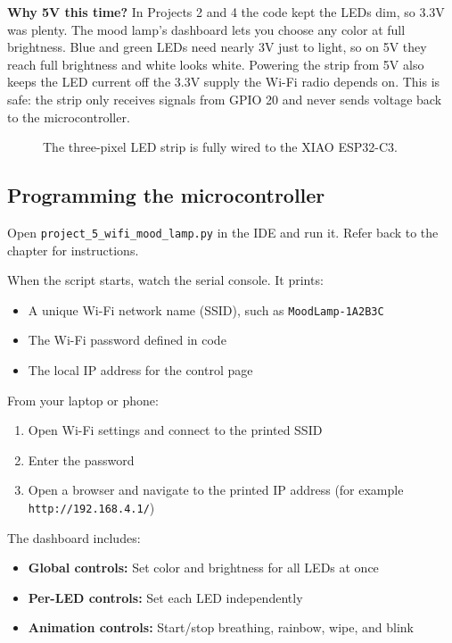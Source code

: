\begin{tcolorbox}[colback=blue!5!white,colframe=blue!40!black]
    \textbf{Why 5V this time?} In Projects 2 and 4 the code kept the LEDs dim, so 3.3V was plenty.
    The mood lamp's dashboard lets you choose any color at full brightness. Blue and green LEDs need
    nearly 3V just to light, so on 5V they reach full brightness and white looks white. Powering the
    strip from 5V also keeps the LED current off the 3.3V supply the Wi-Fi radio depends on. This is
    safe: the strip only receives signals from GPIO 20 and never sends voltage back to the
    microcontroller.
\end{tcolorbox}

\begin{figure}[H]
    \centering
    \caption{The three-pixel LED strip is fully wired to the XIAO ESP32-C3.}
\end{figure}

\subsection{Programming the microcontroller}
Open \texttt{project\_5\_wifi\_mood\_lamp.py} in the IDE and run it.
Refer back to the  chapter for instructions.

When the script starts, watch the serial console. It prints:
\begin{itemize}
    \item A unique Wi-Fi network name (SSID), such as \texttt{MoodLamp-1A2B3C}
    \item The Wi-Fi password defined in code
    \item The local IP address for the control page
\end{itemize}

From your laptop or phone:
\begin{enumerate}
    \item Open Wi-Fi settings and connect to the printed SSID
    \item Enter the password
    \item Open a browser and navigate to the printed IP address (for example \texttt{http://192.168.4.1/})
\end{enumerate}

The dashboard includes:
\begin{itemize}
    \item \textbf{Global controls:} Set color and brightness for all LEDs at once
    \item \textbf{Per-LED controls:} Set each LED independently
    \item \textbf{Animation controls:} Start/stop breathing, rainbow, wipe, and blink
\end{itemize}

